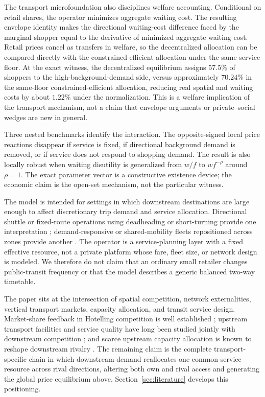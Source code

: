 The transport microfoundation also disciplines welfare accounting. Conditional on retail shares, the operator minimizes aggregate waiting cost. The resulting envelope identity makes the directional waiting-cost difference faced by the marginal shopper equal to the derivative of minimized aggregate waiting cost. Retail prices cancel as transfers in welfare, so the decentralized allocation can be compared directly with the constrained-efficient allocation under the same service floor. At the exact witness, the decentralized equilibrium assigns $57.5\%$ of shoppers to the high-background-demand side, versus approximately $70.24\%$ in the same-floor constrained-efficient allocation, reducing real spatial and waiting costs by about $1.22\%$ under the normalization. This is a welfare implication of the transport mechanism, not a claim that envelope arguments or private--social wedges are new in general.

Three nested benchmarks identify the interaction. The opposite-signed local price reactions disappear if service is fixed, if directional background demand is removed, or if service does not respond to shopping demand. The result is also locally robust when waiting disutility is generalized from $w/f$ to $w f^{-\rho}$ around $\rho=1$. The exact parameter vector is a constructive existence device; the economic claim is the open-set mechanism, not the particular witness.

The model is intended for settings in which downstream destinations are large enough to affect discretionary trip demand and service allocation. Directional shuttle or fixed-route operations using deadheading or short-turning provide one interpretation \citep{furth1985,cortes2011}; demand-responsive or shared-mobility fleets repositioned across zones provide another \citep{liuouyang2021}. The operator is a service-planning layer with a fixed effective resource, not a private platform whose fare, fleet size, or network design is modeled. We therefore do not claim that an ordinary small retailer changes public-transit frequency or that the model describes a generic balanced two-way timetable.

The paper sits at the intersection of spatial competition, network externalities, vertical transport markets, capacity allocation, and transit service design. Market-share feedback in Hotelling competition is well established \citep{grilo2001,grivavettas2011,tolottiyepez2020,toshimitsu2026}; upstream transport facilities and service quality have long been studied jointly with downstream competition \citep{bassozhang2007,depalma2018,alvarez2020}; and scarce upstream capacity allocation is known to reshape downstream rivalry \citep{chenli2013}. The remaining claim is the complete transport-specific chain in which downstream demand reallocates one common service resource across rival directions, altering both own and rival access and generating the global price equilibrium above. Section~\ref{sec:literature} develops this positioning.

